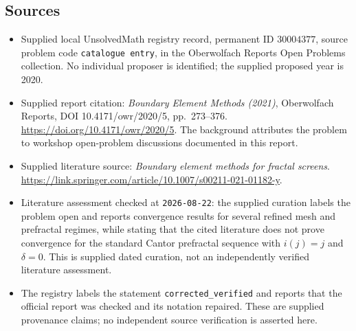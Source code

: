 \documentclass[11pt]{article}
\begin{document}
\subsection{Sources}
\begin{itemize}
\item Supplied local UnsolvedMath registry record, permanent ID \(30004377\), source problem code \texttt{catalogue entry}, in the Oberwolfach Reports Open Problems collection. No individual proposer is identified; the supplied proposed year is 2020.
\item Supplied report citation: \emph{Boundary Element Methods (2021)}, Oberwolfach Reports, DOI 10.4171/owr/2020/5, pp.\ 273--376. \url{https://doi.org/10.4171/owr/2020/5}. The background attributes the problem to workshop open-problem discussions documented in this report.
\item Supplied literature source: \emph{Boundary element methods for fractal screens}. \url{https://link.springer.com/article/10.1007/s00211-021-01182-y}.
\item Literature assessment checked at \texttt{2026-08-22}: the supplied curation labels the problem open and reports convergence results for several refined mesh and prefractal regimes, while stating that the cited literature does not prove convergence for the standard Cantor prefractal sequence with \(i(j)=j\) and \(\delta=0\). This is supplied dated curation, not an independently verified literature assessment.
\item The registry labels the statement \texttt{corrected\_verified} and reports that the official report was checked and its notation repaired. These are supplied provenance claims; no independent source verification is asserted here.
\end{itemize}
\end{document}
